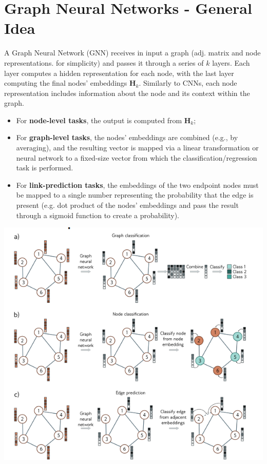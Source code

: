 \section{Graph Neural Networks - General Idea}
A Graph Neural Network (GNN) receives in input a graph (adj. matrix and node representations. for simplicity) and passes it through a series of $k$ layers. Each layer computes a hidden representation for each node, with the last layer computing the final nodes' embeddings $\textbf{H}_k$. Similarly to CNNs, each node representation includes information about the node and its context within the graph.
\begin{itemize}
    \item For \textbf{node-level tasks}, the output is computed from $\textbf{H}_k$;

    \item For \textbf{graph-level tasks}, the nodes' embeddings are combined (e.g., by averaging), and the resulting vector is mapped via a linear transformation or neural network to a fixed-size vector from which the classification/regression task is performed.

    \item For \textbf{link-prediction tasks}, the embeddings of the two endpoint nodes must be mapped to a single number representing the probability that the edge is present (e.g. dot product of the nodes' embeddings and pass the result through a sigmoid function to create a probability).
 
\end{itemize}
\begin{center}
    \includegraphics[]{images/gnn.png}
\end{center}

